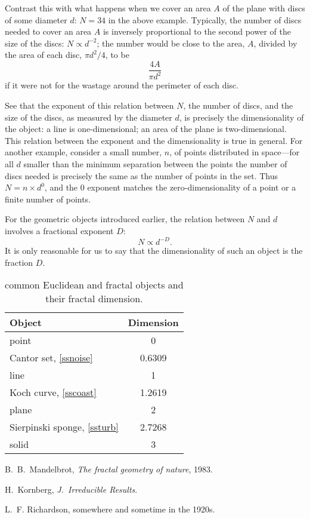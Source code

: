 \documentclass[12pt,a5paper]{article}
\begin{document}
Contrast this with what happens when we cover an area $A$ of the 
plane with discs of some diameter $d$:
\(
	N=34
\)
 in the above example.  Typically, 
the number of discs needed to cover an area 
\(
	A
\)
is inversely proportional to the second power of the size of the 
discs: $N\propto d^{-2}$; the number would be close to the area, 
$A$, divided by the area of each disc, $\pi d^2/4$, to be  
\[
	\frac{4A}{\pi d^2}
\]
if it were not for the wastage around the perimeter of 
each disc.

See that the exponent of this relation between $N$, the number of 
discs, and the size of the discs, as measured by the diameter $d$, 
is precisely the dimensionality of the object: a line is 
one-dimensional; an area of the plane is two-dimensional.  This 
relation between the exponent and the dimensionality is true in 
general.  For another example, consider a small number, $n$, of 
points distributed in space---for all
\(
	d
\)
smaller than the minimum separation between the points the number of 
discs needed is precisely the same as the number of points in the set.  
Thus $N=n\times d^0$, and the 0 exponent matches the 
zero-dimensionality of a point or a finite number of points.

For the geometric objects introduced earlier, the relation between $
N$ and $d$ involves a fractional exponent $D$:
\begin{equation}
	N\propto d^{-D}.
	\label{eqf}
\end{equation}
It is only reasonable for us to say that the 
dimensionality of such an object is the fraction $D$.
\begin{table}
	\caption{common Euclidean and fractal objects and their fractal 
	dimension.}
	\label{T:dimens}
	\begin{center}
        \begin{tabular}{lc}
            \hline
            Object & Dimension  \\
            \hline
            point & 0  \\
            Cantor set, \cref{ssnoise} & 0.6309  \\
            line & 1  \\
            Koch curve, \cref{sscoast} & 1.2619  \\
            plane & 2  \\
            Sierpinski sponge, \cref{ssturb} & 2.7268  \\
            solid & 3  \\
            \hline
        \end{tabular}
	\end{center}
\end{table}

\begin{thebibliography}{99}
	  B.~B.~Mandelbrot, \emph{The fractal geometry of 
	nature}, 1983.

	  H.~Kornberg, \emph{J.\ Irreducible Results}.

	 L.~F. Richardson, somewhere and sometime in the 
	1920s.
\end{thebibliography}
\end{document}
